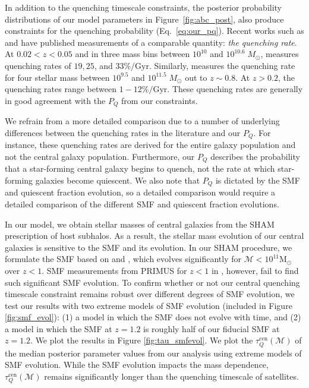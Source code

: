 In addition to the quenching timescale constraints, the posterior 
probability distributions of our model parameters in Figure~\ref{fig:abc_post}, 
also produce constraints for the quenching probability (Eq.~\ref{eq:our_pq}). 
Recent works such as \cite{Moustakas:2013aa} and \cite{Lian:2016aa} 
have published measurements of a comparable quantity: {\em the 
quenching rate}. At $0.02 < z < 0.05$ and in three mass bins between 
$10^{10}$ and $10^{10.6}\; M_\odot$, \cite{Lian:2016aa} measures 
quenching rates of $19, 25$, and $33\%/\mathrm{Gyr}$. Similarly, 
\cite{Moustakas:2013aa} measures the quenching rate for 
four stellar mass between $10^{9.5}$ and $10^{11.5}\; M_\odot$ out 
to $z\sim0.8$. At $z > 0.2$, the \cite{Moustakas:2013aa} quenching 
rates range between $1 - 12\%/\mathrm{Gyr}$. These quenching
rates are generally in good agreement with the $P_{Q}$ from our 
constraints.

We refrain from a more detailed comparison due to 
a number of underlying differences between the quenching rates in 
the literature and our $P_Q$. For instance, these quenching rates 
are derived for the entire galaxy population and not the 
central galaxy population. Furthermore, our $P_Q$ describes the 
probability that a star-forming central galaxy begins to quench, 
not the rate at which star-forming galaxies become quiescent. 
We also note that $P_{Q}$ is dictated by the SMF and quiescent
fraction evolution, so a detailed comparison would require a detailed
comparison of the different SMF and quiescent fraction evolutions. 

In our model, we obtain stellar masses of central galaxies 
from the SHAM prescription of host subhalos. As a result, 
the stellar mass evolution of our central galaxies is sensitive 
to the SMF and its evolution. In our SHAM procedure, we formulate 
the SMF based on \cite{Li:2009aa} and \cite{Marchesini:2009aa},
which evolves significantly for 
$\mathcal{M} < 10^{11} \mathrm{M}_\odot$ over $z < 1$. SMF measurements 
from PRIMUS for $z < 1$ in \cite{Moustakas:2013aa}, however, fail to find 
such significant SMF evolution. To confirm whether or not our 
central quenching timescale constraint remains robust over 
different degrees of SMF evolution, we test our results 
with two extreme models of SMF evolution (included in Figure 
\ref{fig:smf_evol}): (1) a model in which the SMF does not 
evolve with time, and (2) a model in which the SMF at $z = 1.2$ 
is roughly half of our fiducial SMF at $z=1.2$. We plot the 
results in Figure \ref{fig:tau_smfevol}.
We plot the $\tau^\mathrm{cen}_Q(\mathcal{M})$ of the median posterior 
parameter values from our analysis using extreme models of SMF evolution. 
While the SMF evolution impacts the mass dependence,  
$\tau^\mathrm{cen}_Q(\mathcal{M})$ remains significantly longer than the 
quenching timescale of satellites.

